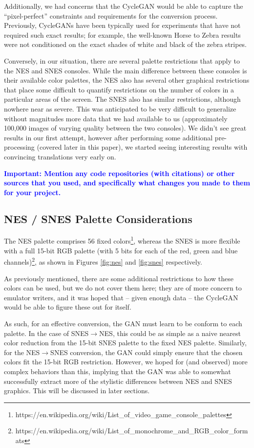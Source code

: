 \documentclass[10pt,twocolumn,letterpaper]{article}
\begin{document}
Additionally, we had concerns that the CycleGAN would be able to capture the ``pixel-perfect'' constraints and requirements for the conversion process. Previously, CycleGANs have been typically used for experiments that have not required such exact results; for example, the well-known Horse to Zebra results were not conditioned on the exact shades of white and black of the zebra stripes.

Conversely, in our situation, there are several palette restrictions that apply to the NES and SNES consoles. While the main difference between these consoles is their available color palettes, the NES also has several other graphical restrictions that place some difficult to quantify restrictions on the number of colors in a particular areas of the screen. The SNES also has similar restrictions, although nowhere near as severe. This was anticipated to be very difficult to generalize without magnitudes more data that we had available to us (approximately 100,000 images of varying quality between the two consoles). We didn't see great results in our first attempt, however after performing some additional pre-processing (covered later in this paper), we started seeing interesting results with convincing translations very early on.

\textbf{\textcolor{blue}{Important: Mention any code repositories (with citations) or other sources that you used, and specifically what changes you made to them for your project.}}

\subsection{NES / SNES Palette Considerations}
The NES palette comprises 56 fixed colors\footnote{https://en.wikipedia.org/wiki/List\_of\_video\_game\_console\_palettes}, whereas the SNES is more flexible with a full 15-bit RGB palette (with 5 bits for each of the red, green and blue channels)\footnote{https://en.wikipedia.org/wiki/List\_of\_monochrome\_and\_RGB\_color\_formats}, as shown in Figures \ref{fig:nes} and \ref{fig:snes} respectively.

As previously mentioned, there are some additional restrictions to how these colors can be used, but we do not cover them here; they are of more concern to emulator writers, and it was hoped that \--- given enough data \--- the CycleGAN would be able to figure these out for itself.

As such, for an effective conversion, the GAN must learn to be conform to each palette. In the case of SNES${\rightarrow}$NES, this could be as simple as a naive nearest color reduction from the 15-bit SNES palette to the fixed NES palette. Similarly, for the NES${\rightarrow}$SNES conversion, the GAN could simply ensure that the chosen colors fit the 15-bit RGB restriction. However, we hoped for (and observed) more complex behaviors than this, implying that the GAN was able to somewhat successfully extract more of the stylistic differences between NES and SNES graphics. This will be discussed in later sections.
\end{document}
